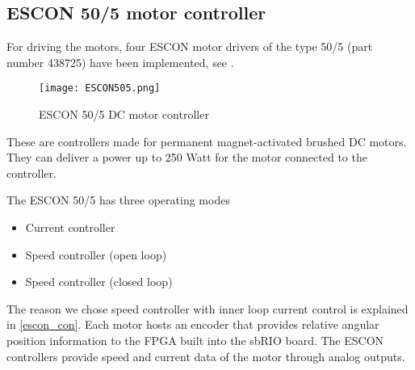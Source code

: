\subsection{ESCON 50/5 motor controller}\label{sec:motor_control}
For driving the motors, four ESCON motor drivers of the type 50/5 (part number 438725) have been implemented, see . 

\begin{figure}[H]
	\centering
		\centering
		\texttt{[image: ESCON505.png]}
		\caption{ESCON 50/5 DC motor controller\cite{ESCON_motor_controller}}
		\label{fig:ESCON505}
\end{figure}

These are controllers made for permanent magnet-activated brushed DC motors. They can deliver a power up to 250 Watt for the motor connected to the controller. 

The ESCON 50/5 has three operating modes

\begin{itemize}
\item Current controller
\item Speed controller (open loop)
\item Speed controller (closed loop)
\end{itemize}

The reason we chose speed controller with inner loop current control is explained in \ref{escon_con}.
Each motor hosts an encoder that provides relative angular position information to the FPGA built into the sbRIO board.
The ESCON controllers provide speed and current data of the motor through analog outputs. 